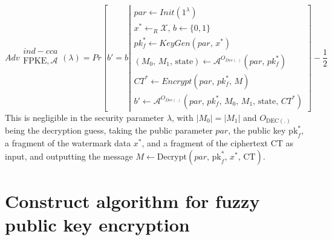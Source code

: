 \documentclass[graybox]{svmult}
\begin{document}
\begin{equation*}
    Adv\begin{array}{c}
        ind-cca                  \\
        \text{FPKE}, \mathcal{A} \\
    \end{array} (\lambda)
    =
    Pr\left[b'= b \left| \begin{array}{c}
            par  \leftarrow Init(1^\lambda)                                                         \\
            x^* \leftarrow_{R} \mathcal{X}, \, b \leftarrow \{0, 1 \}                               \\
            pk^*_f \leftarrow KeyGen(par , \, x^*)                                                  \\

            (M_{0}, \, M_{1}, \, \text{state}) \leftarrow \mathcal{A}^{O_{Dec(.)}}(par , \, pk^*_f) \\
            CT^* \leftarrow Encrypt(par , \, pk^*_f, \, M)                                          \\
            b' \leftarrow \mathcal{A}^{O_{Dec(.)}}(par  , \, pk^*_f, \, M_0, \, M_1, \, \text{state}, \, CT^*)
        \end{array} \right. \right] - \frac{1}{2}
\end{equation*}
This is negligible in the security parameter \( \lambda \), with \( |M_0| = |M_1| \) and \( O_{\text{DEC}(.)} \) being the decryption guess, taking the public parameter \(  par \), the public key \( \text{pk}_f^* \), a fragment of the watermark data \( x^* \), and a fragment of the ciphertext \( \text{CT} \) as input, and outputting the message \( M \leftarrow \text{Decrypt}(par ,\, \text{pk}_f^*,\, x^*,\, \text{CT}) \).


\section{Construct algorithm for fuzzy public key encryption}
\end{document}
